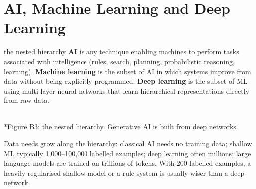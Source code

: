 \documentclass[11pt]{article}
\begin{document}
\section{AI, Machine Learning and Deep Learning}
\begin{definition}{the nested hierarchy}
\textbf{AI} is any technique enabling machines to perform tasks associated with intelligence (rules, search, planning, probabilistic reasoning, learning). \textbf{Machine learning} is the subset of AI in which systems improve from data without being explicitly programmed. \textbf{Deep learning} is the subset of ML using multi-layer neural networks that learn hierarchical representations directly from raw data.
\end{definition}
\begin{center}\\*{\small\color{GreyN}Figure B3: the nested hierarchy. Generative AI is built from deep networks.}\end{center}
Data needs grow along the hierarchy: classical AI needs no training data; shallow ML typically 1,000--100,000 labelled examples; deep learning often millions; large language models are trained on trillions of tokens. With 200 labelled examples, a heavily regularised shallow model or a rule system is usually wiser than a deep network.
\end{document}
